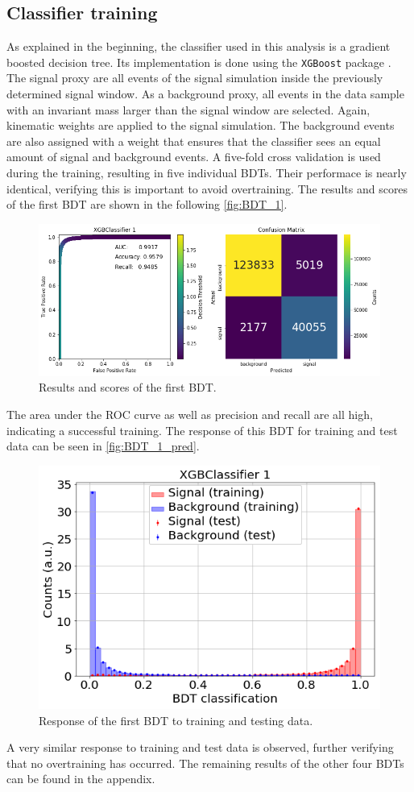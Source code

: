 \subsection{Classifier training}
As explained in the beginning, the classifier used in this analysis is a gradient boosted decision tree. Its implementation is done using the \texttt{XGBoost} package \cite{XGBoost}.
The signal proxy are all events of the signal simulation inside the previously determined signal window. As a background proxy, all events in the data sample with an invariant mass
larger than the signal window are selected. Again, kinematic weights are applied to the signal simulation. The background events are also assigned with a weight that ensures that the
classifier sees an equal amount of signal and background events.
A five-fold cross validation is used during the training, resulting in five individual BDTs. Their performace is nearly identical, verifying this is important to avoid overtraining.
The results and scores of the first BDT are shown in the following \autoref{fig:BDT_1}.
\begin{figure}[H]
	\centering
	\includegraphics[width=0.8\linewidth]{plots/BDT_1.png}
	\caption{Results and scores of the first BDT.}
	\label{fig:BDT_1}
\end{figure}
The area under the ROC curve as well as precision and recall are all high, indicating a successful training.
The response of this BDT for training and test data can be seen in \autoref{fig:BDT_1_pred}.
\begin{figure}[H]
	\centering
	\includegraphics[width=0.5\linewidth]{plots/BDT1_pred.png}
	\caption{Response of the first BDT to training and testing data.}
	\label{fig:BDT_1_pred}
\end{figure}
A very similar response to training and test data is observed, further verifying that no overtraining has occurred.
The remaining results of the other four BDTs can be found in the appendix.

